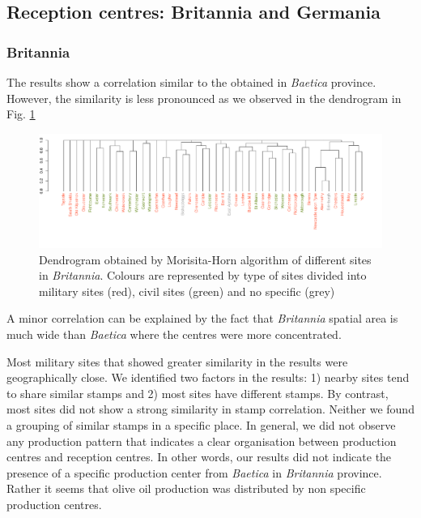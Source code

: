 \documentclass[review]{elsarticle}
\begin{document}
\subsection{Reception centres: Britannia and Germania}

\subsubsection{Britannia}

The results show a correlation similar to the obtained in \textit{Baetica} province. However, the similarity is less pronounced as we observed in the dendrogram in Fig. \ref{britmap}


\begin{figure}[htp]
	\centering
\includegraphics[width=\linewidth]{figs/dendrobrit5.pdf}
\caption{Dendrogram obtained by Morisita-Horn algorithm of different sites in \textit{Britannia}. Colours are represented by type of sites divided into military sites (red), civil sites (green) and no specific (grey)}
\label{britmap}
\end{figure}


A minor correlation can be explained by the fact that \textit{Britannia} spatial area is much wide than \textit{Baetica} where the centres were more concentrated.

Most military sites that showed greater similarity in the results were geographically close. We identified two factors in the results: 1) nearby sites tend to share similar stamps and 2) most sites have different stamps. 
By contrast, most sites did not show a strong similarity in stamp correlation. Neither we found a grouping of similar stamps in a specific place. In general, we did not observe any production pattern that indicates a clear organisation between production centres and reception centres. In other words, our results did not indicate the presence of a specific production center from \textit{Baetica} in \textit{Britannia} province. Rather it seems that olive oil production was distributed by non specific production centres. 
\end{document}
